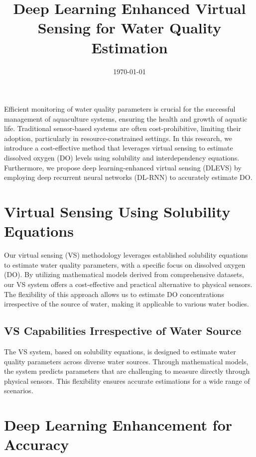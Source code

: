 \documentclass[a4paper, 11pt]{article}
\begin{document}
	
	\title{Deep Learning Enhanced Virtual Sensing for Water Quality Estimation}
	\date{\today}
	\maketitle
	
	
	Efficient monitoring of water quality parameters is crucial for the successful management of aquaculture systems, ensuring the health and growth of aquatic life. Traditional sensor-based systems are often cost-prohibitive, limiting their adoption, particularly in resource-constrained settings. In this research, we introduce a cost-effective method that leverages virtual sensing to estimate dissolved oxygen (DO) levels using solubility and interdependency equations. Furthermore, we propose deep learning-enhanced virtual sensing (DLEVS) by employing deep recurrent neural networks (DL-RNN) to accurately estimate DO. 
	
	\section*{Virtual Sensing Using Solubility Equations}
	
	Our virtual sensing (VS) methodology leverages established solubility equations to estimate water quality parameters, with a specific focus on dissolved oxygen (DO). By utilizing mathematical models derived from comprehensive datasets, our VS system offers a cost-effective and practical alternative to physical sensors. The flexibility of this approach allows us to estimate DO concentrations irrespective of the source of water, making it applicable to various water bodies.
	
	\subsection*{VS Capabilities Irrespective of Water Source}
	
	The VS system, based on solubility equations, is designed to estimate water quality parameters across diverse water sources. Through mathematical models, the system predicts parameters that are challenging to measure directly through physical sensors. This flexibility ensures accurate estimations for a wide range of scenarios.
	
	\section*{Deep Learning Enhancement for Accuracy}
	
\end{document}
